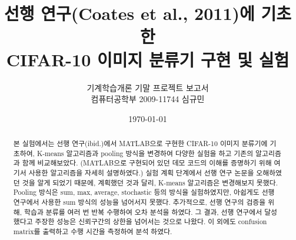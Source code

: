 \documentclass[a4paper,9pt]{article}
\begin{document}
\title{선행 연구(Coates et al., 2011)에 기초한 \\
CIFAR-10 이미지 분류기 구현 및 실험}
\author{기계학습개론 기말 프로젝트 보고서 \\
컴퓨터공학부 2009-11744 심규민}
\date{\koreandate\today}

\maketitle

\begin{abstract}
본 실험에서는 선행 연구(ibid.)에서 MATLAB으로 구현한 CIFAR-10 이미지 분류기에 기초하여, K-means 알고리즘과 pooling 방식을 변경하여 다양한 실험을 하고 기존의 알고리즘과 함께 비교해보았다.
(MATLAB으로 구현되어 있던 데모 코드의 이해를 증명하기 위해 여기서 사용한 알고리즘을 자세히 설명하였다.)
실험 계획 단계에서 선행 연구 논문을 오해하였던 것을 알게 되었기 때문에, 계획했던 것과 달리, K-means 알고리즘은 변경해보지 못했다.
Pooling 방식은 sum, max, average, stochastic 등의 방식을 실험하였지만, 아쉽게도 선행 연구에서 사용한 sum 방식의 성능을 넘어서지 못했다.
추가적으로, 선행 연구의 검증을 위해, 학습과 분류를 여러 번 반복 수행하여 오차 분석을 하였다.
그 결과, 선행 연구에서 달성했다고 주장한 성능은 신뢰구간의 상한을 넘어서는 것으로 나왔다.
이 외에도 confusion matrix를 출력하고 수행 시간을 측정하여 분석 하였다.
\end{abstract}

\tableofcontents

\pagebreak
\end{document}
